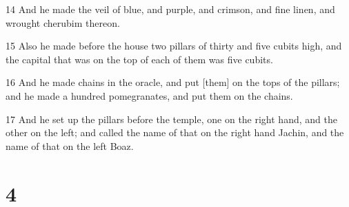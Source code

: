 \par 14 And he made the veil of blue, and purple, and crimson, and fine linen, and wrought cherubim thereon.
\par 15 Also he made before the house two pillars of thirty and five cubits high, and the capital that was on the top of each of them was five cubits.
\par 16 And he made chains in the oracle, and put [them] on the tops of the pillars; and he made a hundred pomegranates, and put them on the chains.
\par 17 And he set up the pillars before the temple, one on the right hand, and the other on the left; and called the name of that on the right hand Jachin, and the name of that on the left Boaz.

\chapter{4}

